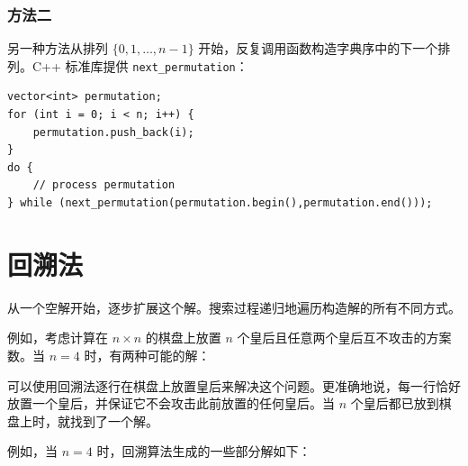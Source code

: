 \subsubsection{方法二}


另一种方法从排列 $\{0,1,\ldots,n-1\}$ 开始，反复调用函数构造字典序中的下一个排列。C++ 标准库提供 \texttt{next\_permutation}：

\begin{lstlisting}
vector<int> permutation;
for (int i = 0; i < n; i++) {
    permutation.push_back(i);
}
do {
    // process permutation
} while (next_permutation(permutation.begin(),permutation.end()));
\end{lstlisting}

\section{回溯法}


从一个空解开始，逐步扩展这个解。搜索过程递归地遍历构造解的所有不同方式。


例如，考虑计算在 $n \times n$ 的棋盘上放置 $n$ 个皇后且任意两个皇后互不攻击的方案数。当 $n=4$ 时，有两种可能的解：

\begin{center}
\end{center}

可以使用回溯法逐行在棋盘上放置皇后来解决这个问题。更准确地说，每一行恰好放置一个皇后，并保证它不会攻击此前放置的任何皇后。当 $n$ 个皇后都已放到棋盘上时，就找到了一个解。

例如，当 $n=4$ 时，回溯算法生成的一些部分解如下：

